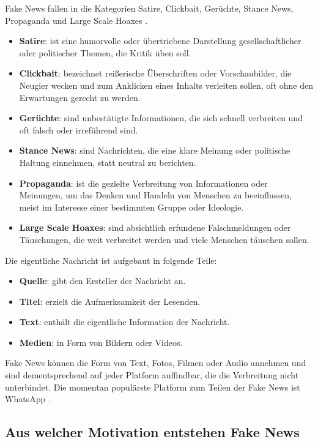Fake News fallen in die Kategorien Satire, Clickbait, Gerüchte, Stance News, Propaganda und Large Scale Hoaxes \cite{Sharma:2024}.

\begin{itemize}
    \item \textbf{Satire}: ist eine humorvolle oder übertriebene Darstellung gesellschaftlicher oder politischer Themen, die Kritik üben soll.
    \item \textbf{Clickbait}: bezeichnet reißerische Überschriften oder Vorschaubilder, die Neugier wecken und zum Anklicken eines Inhalts verleiten sollen, oft ohne den Erwartungen gerecht zu werden.
    \item \textbf{Gerüchte}: sind unbestätigte Informationen, die sich schnell verbreiten und oft falsch oder irreführend sind.
    \item \textbf{Stance News}: sind Nachrichten, die eine klare Meinung oder politische Haltung einnehmen, statt neutral zu berichten.
    \item \textbf{Propaganda}: ist die gezielte Verbreitung von Informationen oder Meinungen, um das Denken und Handeln von Menschen zu beeinflussen, meist im Interesse einer bestimmten Gruppe oder Ideologie.
    \item \textbf{Large Scale Hoaxes}: sind absichtlich erfundene Falschmeldungen oder Täuschungen, die weit verbreitet werden und viele Menschen täuschen sollen.
\end{itemize}

Die eigentliche Nachricht ist aufgebaut in folgende Teile:

\begin{itemize}
    \item \textbf{Quelle}: gibt den Ersteller der Nachricht an.
    \item \textbf{Titel}: erzielt die Aufmerksamkeit der Lesenden.
    \item \textbf{Text}: enthält die eigentliche Information der Nachricht.
    \item \textbf{Medien}: in Form von Bildern oder Videos.
\end{itemize}

Fake News können die Form von Text, Fotos, Filmen oder Audio annehmen und sind dementsprechend auf jeder Platform auffindbar, 
die die Verbreitung nicht unterbindet. Die momentan populärste Platform zum Teilen der Fake News ist WhatsApp \cite{Ashish2024}.

\subsection{Aus welcher Motivation entstehen Fake News}

